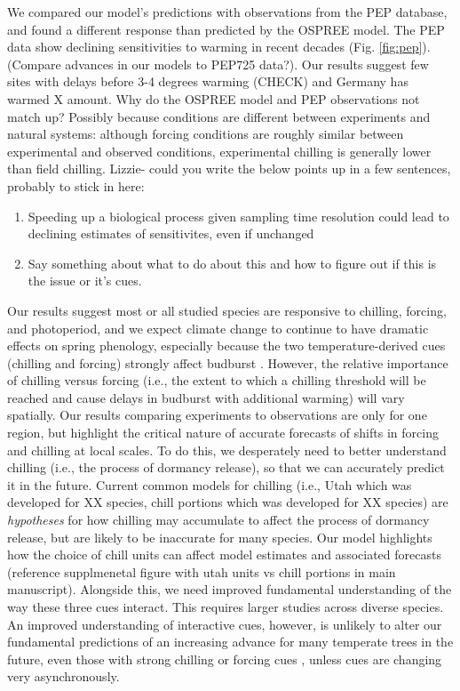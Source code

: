 \documentclass{article}
\begin{document}
\par We compared our model's predictions with observations from the PEP database, and found a different response than predicted by the OSPREE model. The PEP data show declining sensitivities to warming in recent decades (Fig. \ref {fig:pep}). (Compare advances in our models to PEP725 data?). Our results suggest few sites with delays before 3-4 degrees warming (CHECK) and Germany has warmed X amount. Why do the OSPREE model and PEP observations not match up? Possibly because conditions are different between experiments and natural systems: although forcing conditions are roughly similar between experimental and observed conditions, experimental chilling is generally lower than field chilling. 
Lizzie- could you write the below points up in a few sentences, probably to stick in here:
\begin{enumerate}
\item Speeding up a biological process given sampling time resolution could lead to declining estimates of sensitivites, even if unchanged
\item Say something about what to do about this and how to figure out if this is the issue or it's cues. 
\end{enumerate}

\par Our results suggest most or all studied species are responsive to chilling, forcing, and photoperiod, and we expect climate change to continue to have dramatic effects on spring phenology, especially because the two temperature-derived cues (chilling and forcing) strongly affect budburst  \citep{Laube:2014a}. However, the relative importance of chilling versus forcing (i.e., the extent to which a chilling threshold will be reached and cause delays in budburst with additional warming) will vary spatially. Our results comparing experiments to observations are only for one region, but highlight the critical nature of accurate forecasts of shifts in forcing and chilling at local scales. To do this, we desperately need to better understand chilling (i.e., the process of dormancy release), so that we can accurately predict it in the future. Current common models for chilling (i.e., Utah which was developed for XX species,  chill portions which was developed for XX species) are \emph{hypotheses} for how chilling may accumulate to affect the process of dormancy release, but are likely to be inaccurate for many species. Our model highlights how the choice of chill units can affect model estimates and associated forecasts (reference supplmenetal figure with utah units vs chill portions in main manuscript). Alongside this, we need improved fundamental understanding of the way these three cues interact. This requires larger studies across diverse species. An improved understanding of interactive cues, however, is unlikely to alter our fundamental predictions of an increasing advance for many temperate trees in the future, even those with strong chilling or forcing cues \citep{gauzere2017}, unless cues are changing very asynchronously.
\end{document}
